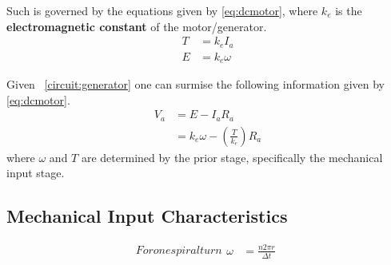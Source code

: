 \documentclass[conference]{IEEEtran}
\newcommand{\figref}[1]{\figurename~\ref{#1}}
\begin{document}
Such is governed by the equations given by \eqref{eq:dcmotor}, where $k_e$ is the \textbf{electromagnetic constant} of the motor/generator.
\begin{subequations}
    \label{eq:dcmotor}
    \begin{align}
        T &= k_e I_a
        \label{eq:dcmotor:torque}\\
        E &= k_e \omega
        \label{eq:dcmotor:emf}
    \end{align}
\end{subequations}

Given \figref{circuit:generator} one can surmise the following information given by \eqref{eq:dcmotor}.
\begin{equation}
    \label{eq:circuit}
    \begin{aligned}
        V_a &= E - I_aR_a\\
        &= k_e\omega - \left(\frac{T}{k_e}\right)R_a
    \end{aligned}
\end{equation}
where \(\omega\) and \(T\) are determined by the prior stage, specifically the mechanical input stage.

\subsection{Mechanical Input Characteristics}
\begin{subequations}
    For one spiral turn
    \begin{align}
        \omega &= \frac{n 2\pi r}{\Delta t}
    \end{align}
\end{subequations}





\medskip


\end{document}
